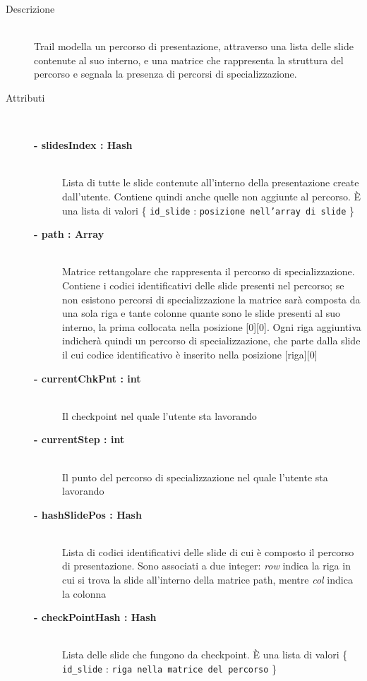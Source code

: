 \begin{description}
\item[Descrizione] \hfill \\
	Trail modella un percorso di presentazione, attraverso una lista delle slide contenute al suo interno, e una matrice che rappresenta la struttura del percorso e segnala la presenza di percorsi di specializzazione.
	
	

	
	
\item[Attributi] \hfill \\
	\begin{description}
		\item[\textbf{- slidesIndex : Hash			}] \hfill \\
			Lista di tutte le slide contenute all'interno della presentazione create dall'utente. Contiene quindi anche quelle non aggiunte al percorso. È una lista di valori \{ \texttt{id\_{}slide} : \texttt{posizione nell'array di slide} \}
		\item[\textbf{- path : Array			}] \hfill \\
			Matrice rettangolare che rappresenta il percorso di specializzazione. Contiene i codici identificativi delle slide presenti nel percorso; se non esistono percorsi di specializzazione la matrice sarà composta da una sola riga e tante colonne quante sono le slide presenti al suo interno, la prima collocata nella posizione [0][0]. Ogni riga aggiuntiva indicherà quindi un percorso di specializzazione, che parte dalla slide il cui codice identificativo è inserito nella posizione [riga][0]
			\item[\textbf{- currentChkPnt : int			}] \hfill \\
			Il checkpoint nel quale l'utente sta lavorando
			\item[\textbf{- currentStep : int			}] \hfill \\
			Il punto del percorso di specializzazione nel quale l'utente sta lavorando
			\item[\textbf{- hashSlidePos : Hash			}] \hfill \\
			Lista di codici identificativi delle slide di cui è composto il percorso di presentazione. Sono associati a due integer: \textit{row} indica la riga in cui si trova la slide all'interno della matrice path, mentre \textit{col} indica la colonna
			\item[\textbf{- checkPointHash : Hash		}] \hfill \\
			Lista delle slide che fungono da checkpoint. È una lista di valori  \{ \texttt{id\_{}slide} : \texttt{riga nella matrice del percorso} \}
	\end{description}
	

\end{description}
